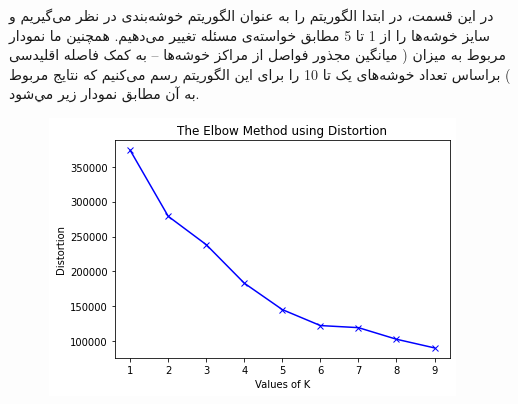 \documentclass[10pt,onecolumn,a4paper]{article}
\begin{document}
در این قسمت، در ابتدا الگوریتم  را به عنوان الگوریتم خوشه‌بندی در نظر می‌گیریم و سایز خوشه‌ها را از 1 تا 5 مطابق خواسته‌ی مسئله تغییر می‌دهیم. همچنین ما نمودار مربوط به میزان   (  میانگین مجذور فواصل از مراکز خوشه‌ها – به کمک فاصله اقلیدسی ) براساس تعداد خوشه‌های یک تا 10  را برای این الگوریتم رسم می‌کنیم که نتایج مربوط به آن مطابق نمودار زير مي‌شود. 
\\

\begin{figure}[h!]
        \centering
        \includegraphics[scale=0.6]{km1.png}
        \caption{  }  
    \end{figure}
\end{document}
